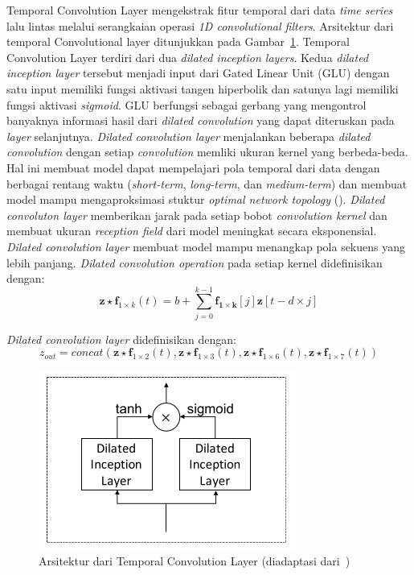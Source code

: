 Temporal Convolution Layer mengekstrak fitur temporal dari data \textit{time series} lalu lintas melalui serangkaian operasi \textit{1D convolutional filters}. Arsitektur dari temporal Convolutional layer ditunjukkan pada Gambar~\ref{fig:tc-layer}. Temporal Convolution Layer terdiri dari dua \textit{dilated inception layers}. Kedua \textit{dilated inception layer} tersebut menjadi input dari Gated Linear Unit (GLU) dengan satu input memiliki fungsi aktivasi tangen hiperbolik dan satunya lagi memiliki fungsi aktivasi \textit{sigmoid}. GLU berfungsi sebagai gerbang yang mengontrol banyaknya informasi hasil dari \textit{dilated convolution} yang dapat diteruskan pada \textit{layer} selanjutnya. \textit{Dilated convolution layer} menjalankan beberapa \textit{dilated convolution} dengan setiap \textit{convolution} memliki ukuran kernel yang berbeda-beda. Hal ini membuat model dapat mempelajari pola temporal dari data dengan berbagai rentang waktu (\textit{short-term}, \textit{long-term}, dan \textit{medium-term}) dan membuat model mampu mengaproksimasi stuktur \textit{optimal network topology} (\cite{Wu2020}). \textit{Dilated convoluton layer} memberikan jarak pada setiap bobot \textit{convolution kernel} dan membuat ukuran \textit{reception field } dari model meningkat secara eksponensial. \textit{Dilated convolution layer} membuat model mampu menangkap pola sekuens yang lebih panjang. \textit{Dilated convolution operation} pada setiap kernel didefinisikan dengan:
\begin{equation}
    \mathbf{z} \star \mathbf{f}_{1\times k}(t)  =b+\sum_{j=0}^{k-1}  \mathbf{f_{1\times k}}[j] \mathbf{z}[t-d\times j]
\end{equation}

\textit{Dilated convolution layer} didefinisikan dengan:
\begin{equation}
    z_{out}= concat(\mathbf{z} \star \mathbf{f}_{1\times 2}(t), \mathbf{z} \star \mathbf{f}_{1\times 3}(t), \mathbf{z} \star \mathbf{f}_{1\times 6}(t), \mathbf{z} \star \mathbf{f}_{1\times 7}(t))
\end{equation}

\begin{figure}[H]
    \centering
    \includegraphics[]{figures/tc_layer.png}
    \caption{Arsitektur dari Temporal Convolution Layer (diadaptasi dari~\cite{Wu2020})}
    \label{fig:tc-layer}
\end{figure}

